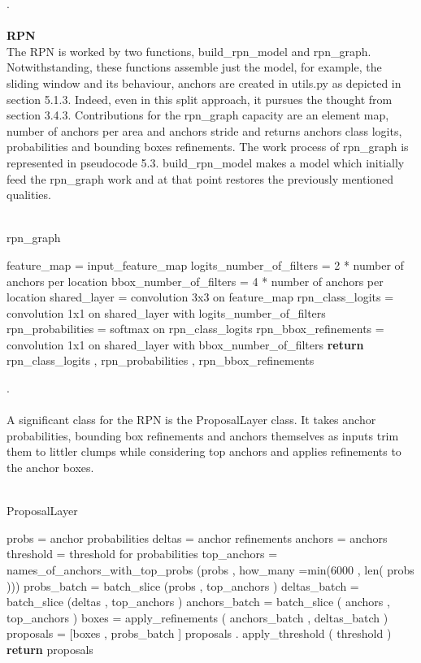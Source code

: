 .\\
\\
 \textbf{RPN}
\\
The RPN is worked by two functions, build\_rpn\_model and rpn\_graph. Notwithstanding, these functions assemble just the model, for example, the sliding window and its behaviour, anchors are created in utils.py as depicted in section 5.1.3. Indeed, even in this split approach, it pursues the thought from section 3.4.3. Contributions for the rpn\_graph capacity are an element map, number of anchors per area and anchors stride and returns anchors class logits, probabilities and bounding boxes refinements. The work process of rpn\_graph is represented in pseudocode 5.3. build\_rpn\_model makes a model which initially feed the rpn\_graph work and at that point restores the previously mentioned qualities.
\\
\\
\begin{algorithm}[H]
  \caption{rpn\_graph}
  \SetAlgoLined
  \DontPrintSemicolon
  feature\_map = input\_feature\_map\;
  logits\_number\_of\_filters = 2 * number of anchors per location\;
   bbox\_number\_of\_filters = 4 * number of anchors per location\;
   shared\_layer = convolution 3x3 on feature\_map\;
   rpn\_class\_logits = convolution 1x1 on shared\_layer with logits\_number\_of\_filters\;
  rpn\_probabilities = softmax on rpn\_class\_logits\;
   rpn\_bbox\_refinements = convolution 1x1 on shared\_layer with bbox\_number\_of\_filters\;
   \textbf{return} rpn\_class\_logits , rpn\_probabilities , rpn\_bbox\_refinements\;
  
  \end{algorithm}
  .\\
\\
  A significant class for the RPN is the ProposalLayer class. It takes anchor probabilities, bounding box refinements and anchors themselves as inputs trim them to littler clumps while considering top anchors and applies refinements to the anchor boxes.
\\
\\
\begin{algorithm}[H]
  \caption{ProposalLayer}
  \SetAlgoLined
  \DontPrintSemicolon

probs = anchor probabilities\;
deltas = anchor refinements\;
anchors = anchors\;
threshold = threshold for probabilities\;
top\_anchors = names\_of\_anchors\_with\_top\_probs (probs , how\_many =min(6000 , len( probs )))\;
 probs\_batch = batch\_slice (probs , top\_anchors )\;
 deltas\_batch = batch\_slice (deltas , top\_anchors )\;
 anchors\_batch = batch\_slice ( anchors , top\_anchors )\;
 boxes = apply\_refinements ( anchors\_batch , deltas\_batch )\;
 proposals = [boxes , probs\_batch ]\;
 proposals . apply\_threshold ( threshold )\;
 \textbf{return} proposals\;

  \end{algorithm}
